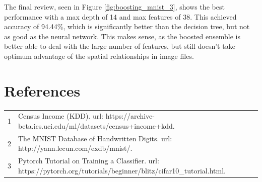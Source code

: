 \documentclass[letterpaper]{article} %
\begin{document}
The final review, seen in Figure \ref{fig:boosting_mnist_3}, shows the best performance with a max depth of 14 and max features of 38.  This achieved accuracy of 94.44\%, which is significantly better than the decision tree, but not as good as the neural network.  This makes sense, as the boosted ensemble is better able to deal with the large number of features, but still doesn't take optimum advantage of the spatial relationships in image files.


\section{References}
\begin{tabular}{l p{2.75in}}
\\
1 & Census Income (KDD). url: https://archive-beta.ics.uci.edu/ml/datasets/census+income+kdd.
\\
2 & The MNIST Database of Handwritten Digits. url: http://yann.lecun.com/exdb/mnist/.
\\
3 & Pytorch Tutorial on Training a Classifier. url: https://pytorch.org/tutorials/beginner/blitz/cifar10\_tutorial.html.
\end{tabular}
\end{document}
